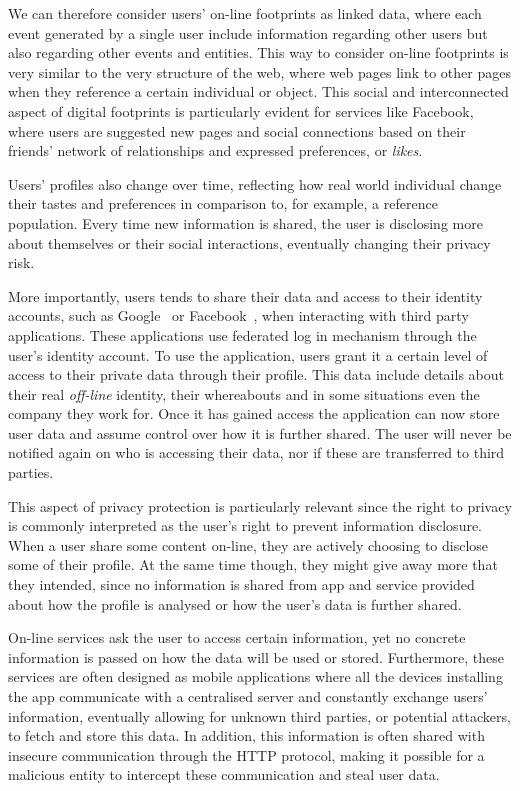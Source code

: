 We can therefore consider users' on-line footprints as linked data, where each event generated by a single user include information regarding other users but also regarding other events and entities. This way to consider on-line footprints is very similar to the very structure of the web, where web pages link to other pages when they reference a certain individual or object. This social and interconnected aspect of digital footprints is particularly evident for services like Facebook\cite{facebook}, where users are suggested new pages and social connections based on their friends' network of relationships and expressed preferences, or \emph{likes}.

Users' profiles also change over time, reflecting how real world individual change their tastes and preferences in comparison to, for example, a reference population. Every time new information is shared, the user is disclosing more about themselves or their social interactions, eventually changing their privacy risk.

More importantly, users tends to share their data and access to their identity accounts, such as Google~\cite{google} or Facebook~\cite{facebook}, when interacting with third party applications. These applications use federated log in mechanism through the user's identity account. To use the application, users grant it a certain level of access to their private data through their profile. This data include details about their real \emph{off-line} identity, their whereabouts and in some situations even the company they work for. Once it has gained access the application can now store user data and assume control over how it is further shared.  The  user  will never be notified again on who is accessing their data, nor if these are transferred to third parties. 

This aspect of privacy protection is particularly relevant since the right to privacy is commonly interpreted as the user's right to prevent information disclosure. When a user share some content on-line, they are actively choosing to disclose some of their profile. At the same time though, they might give away more that they intended, since no information is shared from app and service provided about how the profile is analysed or how the user's data is further shared. 

On-line services ask the user to access certain information, yet no concrete information is passed on how the data will be used or stored. Furthermore, these services are often designed as mobile applications where all the devices installing the  app communicate with a centralised server and constantly exchange users' information, eventually allowing for unknown third parties, or potential attackers, to fetch and store this data. In addition, this information is often shared with insecure communication through the HTTP protocol, making it possible for a malicious entity to intercept these communication and steal user data. 

